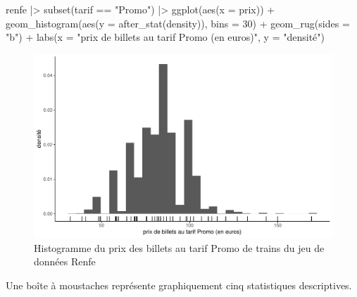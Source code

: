\documentclass[
  11pt,
  letterpaper,
]{scrbook}
\newenvironment{Shaded}{\begin{snugshade}}{\end{snugshade}}
\newcommand{\AttributeTok}[1]{\textcolor[rgb]{0.40,0.45,0.13}{#1}}
\newcommand{\DecValTok}[1]{\textcolor[rgb]{0.68,0.00,0.00}{#1}}
\newcommand{\FunctionTok}[1]{\textcolor[rgb]{0.28,0.35,0.67}{#1}}
\newcommand{\NormalTok}[1]{\textcolor[rgb]{0.00,0.23,0.31}{#1}}
\newcommand{\SpecialCharTok}[1]{\textcolor[rgb]{0.37,0.37,0.37}{#1}}
\newcommand{\StringTok}[1]{\textcolor[rgb]{0.13,0.47,0.30}{#1}}
\theoremstyle{definition}
\theoremstyle{remark}
\begin{document}
\begin{Shaded}
\begin{Highlighting}[]
\NormalTok{renfe }\SpecialCharTok{|\textgreater{}}
  \FunctionTok{subset}\NormalTok{(tarif }\SpecialCharTok{==} \StringTok{"Promo"}\NormalTok{) }\SpecialCharTok{|\textgreater{}}
  \FunctionTok{ggplot}\NormalTok{(}\FunctionTok{aes}\NormalTok{(}\AttributeTok{x =}\NormalTok{ prix)) }\SpecialCharTok{+} 
    \FunctionTok{geom\_histogram}\NormalTok{(}\FunctionTok{aes}\NormalTok{(}\AttributeTok{y =} \FunctionTok{after\_stat}\NormalTok{(density)), }
                   \AttributeTok{bins =} \DecValTok{30}\NormalTok{) }\SpecialCharTok{+}
    \FunctionTok{geom\_rug}\NormalTok{(}\AttributeTok{sides =} \StringTok{"b"}\NormalTok{) }\SpecialCharTok{+} 
    \FunctionTok{labs}\NormalTok{(}\AttributeTok{x =} \StringTok{"prix de billets au tarif Promo (en euros)"}\NormalTok{, }
         \AttributeTok{y =} \StringTok{"densité"}\NormalTok{) }
\end{Highlighting}
\end{Shaded}

\begin{figure}[ht!]

{\centering \includegraphics[width=1\textwidth,height=\textheight]{./01-analyseexploratoire_files/figure-pdf/fig-histrenfe-1.pdf}

}

\caption{\label{fig-histrenfe}Histogramme du prix des billets au tarif
Promo de trains du jeu de données Renfe}

\end{figure}

Une boîte à moustaches représente graphiquement cinq statistiques
descriptives.
\end{document}
